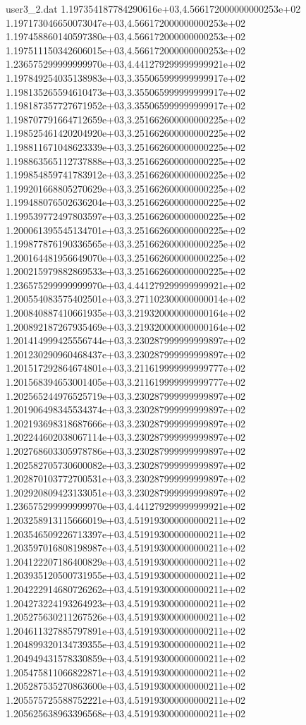 \begin{filecontents}{user3_2.dat}
1.197354187784290616e+03,4.566172000000000253e+02
1.197173046650073047e+03,4.566172000000000253e+02
1.197458860140597380e+03,4.566172000000000253e+02
1.197511150342606015e+03,4.566172000000000253e+02
1.236575299999999970e+03,4.441279299999999921e+02
1.197849254035138983e+03,3.355065999999999917e+02
1.198135265594610473e+03,3.355065999999999917e+02
1.198187357727671952e+03,3.355065999999999917e+02
1.198707791664712659e+03,3.251662600000000225e+02
1.198525461420204920e+03,3.251662600000000225e+02
1.198811671048623339e+03,3.251662600000000225e+02
1.198863565112737888e+03,3.251662600000000225e+02
1.199854859741783912e+03,3.251662600000000225e+02
1.199201668805270629e+03,3.251662600000000225e+02
1.199488076502636204e+03,3.251662600000000225e+02
1.199539772497803597e+03,3.251662600000000225e+02
1.200061395545134701e+03,3.251662600000000225e+02
1.199877876190336565e+03,3.251662600000000225e+02
1.200164481956649070e+03,3.251662600000000225e+02
1.200215979882869533e+03,3.251662600000000225e+02
1.236575299999999970e+03,4.441279299999999921e+02
1.200554083575402501e+03,3.271102300000000014e+02
1.200840887410661935e+03,3.219320000000000164e+02
1.200892187267935469e+03,3.219320000000000164e+02
1.201414999425556744e+03,3.230287999999999897e+02
1.201230290960468437e+03,3.230287999999999897e+02
1.201517292864674801e+03,3.211619999999999777e+02
1.201568394653001405e+03,3.211619999999999777e+02
1.202565244976525719e+03,3.230287999999999897e+02
1.201906498345534374e+03,3.230287999999999897e+02
1.202193698318687666e+03,3.230287999999999897e+02
1.202244602038067114e+03,3.230287999999999897e+02
1.202768603305978786e+03,3.230287999999999897e+02
1.202582705730600082e+03,3.230287999999999897e+02
1.202870103772700531e+03,3.230287999999999897e+02
1.202920809423133051e+03,3.230287999999999897e+02
1.236575299999999970e+03,4.441279299999999921e+02
1.203258913115666019e+03,4.519193000000000211e+02
1.203546509226713397e+03,4.519193000000000211e+02
1.203597016808198987e+03,4.519193000000000211e+02
1.204122207186400829e+03,4.519193000000000211e+02
1.203935120500731955e+03,4.519193000000000211e+02
1.204222914680726262e+03,4.519193000000000211e+02
1.204273224193264923e+03,4.519193000000000211e+02
1.205275630211267526e+03,4.519193000000000211e+02
1.204611327885797891e+03,4.519193000000000211e+02
1.204899320134739355e+03,4.519193000000000211e+02
1.204949431578330859e+03,4.519193000000000211e+02
1.205475811066822871e+03,4.519193000000000211e+02
1.205287535270863600e+03,4.519193000000000211e+02
1.205575725588752221e+03,4.519193000000000211e+02
1.205625638963396568e+03,4.519193000000000211e+02

\end{filecontents}
